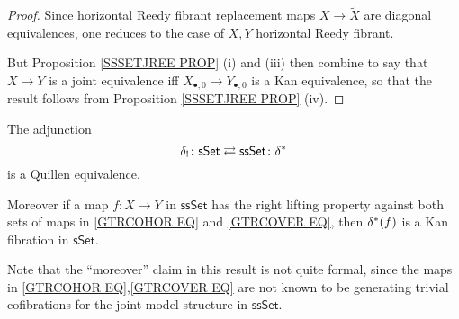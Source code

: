 \documentclass[a4paper,10pt,draft]{article}%
\begin{document}
\begin{proof}
	Since horizontal Reedy fibrant replacement maps
	$X \to \tilde{X}$ are diagonal equivalences, 
	one reduces to the case of $X,Y$ horizontal Reedy fibrant.
	
	But Proposition \ref{SSSETJREE PROP} (i) and (iii) then combine to say that $X \to Y$ is a joint equivalence iff
	$X_{\bullet,0} \to Y_{\bullet,0}$ is a Kan equivalence, 
	so that the result follows from Proposition \ref{SSSETJREE PROP} (iv).
\end{proof}

\begin{corollary}\label{SSETSSETADJ COR}
	The adjunction
\[
	\delta_{!}\colon \mathsf{sSet} 
		\rightleftarrows 
	\mathsf{ssSet} \colon \delta^{\**}
\]
is a Quillen equivalence.

Moreover if a map $f\colon X \to Y$ in $\mathsf{ssSet}$ has the right lifting property
against both sets of maps in
\eqref{GTRCOHOR EQ} and \eqref{GTRCOVER EQ}, then
$\delta^{\**} (f)$ is a Kan fibration in $\mathsf{sSet}$.
\end{corollary}

Note that the ``moreover'' claim in this result is not quite formal, since the maps in \eqref{GTRCOHOR EQ},\eqref{GTRCOVER EQ} are not known to be generating trivial cofibrations for the joint model structure in $\mathsf{ssSet}$.
\end{document}
